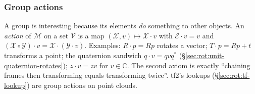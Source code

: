 \subsubsection{Group actions}
A group is interesting because its elements \emph{do} something to other objects. An \emph{action} of $\mathcal M$ on a set $\mathcal V$ is a map $(\mathcal X,v)\mapsto\mathcal X\cdot v$ with $\mathcal E\cdot v=v$ and $(\mathcal X\circ\mathcal Y)\cdot v=\mathcal X\cdot(\mathcal Y\cdot v)$. Examples: $R\cdot p=Rp$ rotates a vector; $T\cdot p=Rp+t$ transforms a point; the quaternion sandwich $q\cdot v=qvq^*$ (\S\ref{sec:rot:unit-quaternion-rotates}); $z\cdot v=zv$ for $v\in\mathbb C$. The second axiom is exactly ``chaining frames then transforming equals transforming twice''. tf2's lookups (\S\ref{sec:rot:tf-lookup}) are group actions on point clouds.
